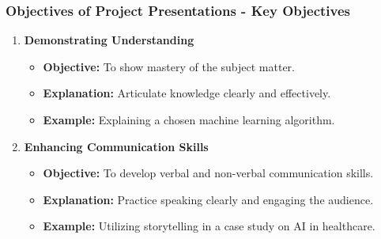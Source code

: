 \documentclass[aspectratio=169]{beamer}
\begin{document}
\begin{frame}[fragile]
    \frametitle{Objectives of Project Presentations - Key Objectives}
    \begin{enumerate}
        \item \textbf{Demonstrating Understanding}
        \begin{itemize}
            \item \textbf{Objective:} To show mastery of the subject matter.
            \item \textbf{Explanation:} Articulate knowledge clearly and effectively.
            \item \textbf{Example:} Explaining a chosen machine learning algorithm.
        \end{itemize}
        
        \item \textbf{Enhancing Communication Skills}
        \begin{itemize}
            \item \textbf{Objective:} To develop verbal and non-verbal communication skills.
            \item \textbf{Explanation:} Practice speaking clearly and engaging the audience.
            \item \textbf{Example:} Utilizing storytelling in a case study on AI in healthcare.
        \end{itemize}
    \end{enumerate}
\end{frame}
\end{document}
